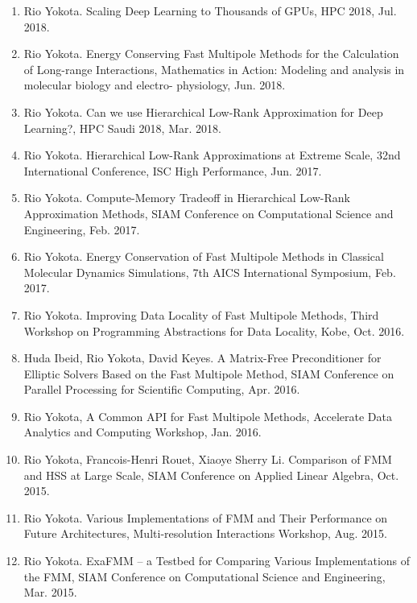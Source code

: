 \documentclass[margin,line]{cv}
\begin{document}
\begin{resume}
\begin{enumerate}
\item Rio Yokota. Scaling Deep Learning to Thousands of GPUs, HPC 2018, Jul. 2018.

\item Rio Yokota. Energy Conserving Fast Multipole Methods for the Calculation of Long-range Interactions, Mathematics in Action: Modeling and analysis in molecular biology and electro- physiology, Jun. 2018.

\item Rio Yokota. Can we use Hierarchical Low-Rank Approximation for Deep Learning?, HPC Saudi 2018, Mar. 2018.

\item Rio Yokota. Hierarchical Low-Rank Approximations at Extreme Scale, 32nd International Conference, ISC High Performance, Jun. 2017.

\item Rio Yokota. Compute-Memory Tradeoff in Hierarchical Low-Rank Approximation Methods, SIAM Conference on Computational Science and Engineering, Feb. 2017.

\item Rio Yokota. Energy Conservation of Fast Multipole Methods in Classical Molecular Dynamics Simulations, 7th AICS International Symposium, Feb. 2017.

\item Rio Yokota. Improving Data Locality of Fast Multipole Methods, Third Workshop on Programming Abstractions for Data Locality, Kobe, Oct. 2016.

\item Huda Ibeid, Rio Yokota, David Keyes. A Matrix-Free Preconditioner for Elliptic Solvers Based on the Fast Multipole Method, SIAM Conference on Parallel Processing for Scientific Computing, Apr. 2016.

\item Rio Yokota, A Common API for Fast Multipole Methods, Accelerate Data Analytics and Computing Workshop, Jan. 2016.

\item Rio Yokota, Francois-Henri Rouet, Xiaoye Sherry Li. Comparison of FMM and HSS at Large Scale, SIAM Conference on Applied Linear Algebra, Oct. 2015.

\item Rio Yokota. Various Implementations of FMM and Their Performance on Future Architectures, Multi-resolution Interactions Workshop, Aug. 2015.

\item Rio Yokota. ExaFMM -- a Testbed for Comparing Various Implementations of the FMM, SIAM Conference on Computational Science and Engineering, Mar. 2015.


\end{enumerate}
\end{resume}
\end{document}
